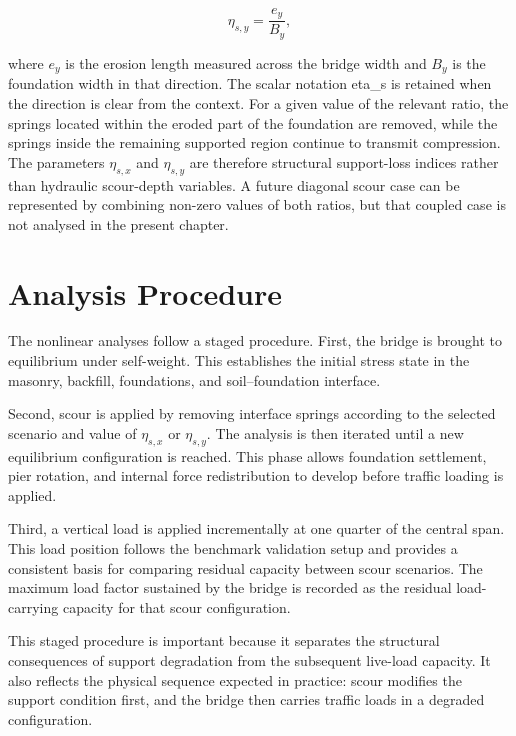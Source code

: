 \begin{equation}
\eta_{s,y} = \frac{e_y}{B_y},
\label{eq:dmem-scour-ratio-y}
\end{equation}

where $e_y$ is the erosion length measured across the bridge width and $B_y$ is the foundation width in that direction. The scalar notation \gls{eta_s} is retained when the direction is clear from the context. For a given value of the relevant ratio, the springs located within the eroded part of the foundation are removed, while the springs inside the remaining supported region continue to transmit compression. The parameters $\eta_{s,x}$ and $\eta_{s,y}$ are therefore structural support-loss indices rather than hydraulic scour-depth variables. A future diagonal scour case can be represented by combining non-zero values of both ratios, but that coupled case is not analysed in the present chapter.

\section{Analysis Procedure}
\label{sec:dmem-scour-analysis-procedure}

The nonlinear analyses follow a staged procedure. First, the bridge is brought to equilibrium under self-weight. This establishes the initial stress state in the masonry, backfill, foundations, and soil--foundation interface.

Second, scour is applied by removing interface springs according to the selected scenario and value of $\eta_{s,x}$ or $\eta_{s,y}$. The analysis is then iterated until a new equilibrium configuration is reached. This phase allows foundation settlement, pier rotation, and internal force redistribution to develop before traffic loading is applied.

Third, a vertical load is applied incrementally at one quarter of the central span. This load position follows the benchmark validation setup and provides a consistent basis for comparing residual capacity between scour scenarios. The maximum load factor sustained by the bridge is recorded as the residual load-carrying capacity for that scour configuration.

This staged procedure is important because it separates the structural consequences of support degradation from the subsequent live-load capacity. It also reflects the physical sequence expected in practice: scour modifies the support condition first, and the bridge then carries traffic loads in a degraded configuration.


